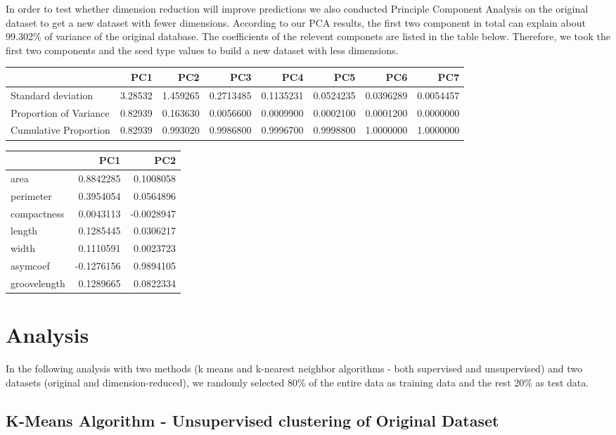 \documentclass[]{article}
\begin{document}
In order to test whether dimension reduction will improve predictions we
also conducted Principle Component Analysis on the original dataset to
get a new dataset with fewer dimensions. According to our PCA results,
the first two component in total can explain about 99.302\% of variance
of the original database. The coefficients of the relevent componets are
listed in the table below. Therefore, we took the first two components
and the seed type values to build a new dataset with less dimensions.

\begin{longtable}[]{@{}lrrrrrrr@{}}
\toprule
& PC1 & PC2 & PC3 & PC4 & PC5 & PC6 & PC7\tabularnewline
\midrule
\endhead
Standard deviation & 3.28532 & 1.459265 & 0.2713485 & 0.1135231 &
0.0524235 & 0.0396289 & 0.0054457\tabularnewline
Proportion of Variance & 0.82939 & 0.163630 & 0.0056600 & 0.0009900 &
0.0002100 & 0.0001200 & 0.0000000\tabularnewline
Cumulative Proportion & 0.82939 & 0.993020 & 0.9986800 & 0.9996700 &
0.9998800 & 1.0000000 & 1.0000000\tabularnewline
\bottomrule
\end{longtable}

\begin{longtable}[]{@{}lrr@{}}
\toprule
& PC1 & PC2\tabularnewline
\midrule
\endhead
area & 0.8842285 & 0.1008058\tabularnewline
perimeter & 0.3954054 & 0.0564896\tabularnewline
compactness & 0.0043113 & -0.0028947\tabularnewline
length & 0.1285445 & 0.0306217\tabularnewline
width & 0.1110591 & 0.0023723\tabularnewline
asymcoef & -0.1276156 & 0.9894105\tabularnewline
groovelength & 0.1289665 & 0.0822334\tabularnewline
\bottomrule
\end{longtable}

\section{Analysis}\label{analysis}

In the following analysis with two methods (k means and k-nearest
neighbor algorithms - both supervised and unsupervised) and two datasets
(original and dimension-reduced), we randomly selected 80\% of the
entire data as training data and the rest 20\% as test data.

\subsection{K-Means Algorithm - Unsupervised clustering of Original
Dataset}\label{k-means-algorithm---unsupervised-clustering-of-original-dataset}
\end{document}
